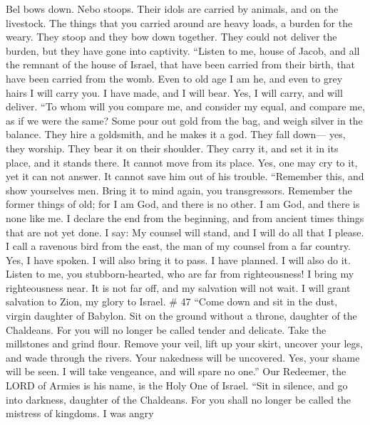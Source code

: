  Bel bows down. Nebo stoops. Their idols are carried by
animals, and on the livestock. The things that you carried around are
heavy loads, a burden for the weary.  They stoop and they
bow down together. They could not deliver the burden, but they have gone
into captivity.  ``Listen to me, house of Jacob, and all the
remnant of the house of Israel, that have been carried from their birth,
that have been carried from the womb.  Even to old age I am
he, and even to grey hairs I will carry you. I have made, and I will
bear. Yes, I will carry, and will deliver.  ``To whom will
you compare me, and consider my equal, and compare me, as if we were the
same?  Some pour out gold from the bag, and weigh silver in
the balance. They hire a goldsmith, and he makes it a god. They fall
down--- yes, they worship.  They bear it on their shoulder.
They carry it, and set it in its place, and it stands there. It cannot
move from its place. Yes, one may cry to it, yet it can not answer. It
cannot save him out of his trouble.  ``Remember this, and
show yourselves men. Bring it to mind again, you transgressors.
 Remember the former things of old; for I am God, and there
is no other. I am God, and there is none like me.  I
declare the end from the beginning, and from ancient times things that
are not yet done. I say: My counsel will stand, and I will do all that I
please.  I call a ravenous bird from the east, the man of
my counsel from a far country. Yes, I have spoken. I will also bring it
to pass. I have planned. I will also do it.  Listen to me,
you stubborn-hearted, who are far from righteousness!  I
bring my righteousness near. It is not far off, and my salvation will
not wait. I will grant salvation to Zion, my glory to Israel. \# 47
 ``Come down and sit in the dust, virgin daughter of
Babylon. Sit on the ground without a throne, daughter of the Chaldeans.
For you will no longer be called tender and delicate.  Take
the millstones and grind flour. Remove your veil, lift up your skirt,
uncover your legs, and wade through the rivers.  Your
nakedness will be uncovered. Yes, your shame will be seen. I will take
vengeance, and will spare no one.''  Our Redeemer, the LORD
of Armies is his name, is the Holy One of Israel.  ``Sit in
silence, and go into darkness, daughter of the Chaldeans. For you shall
no longer be called the mistress of kingdoms.  I was angry
